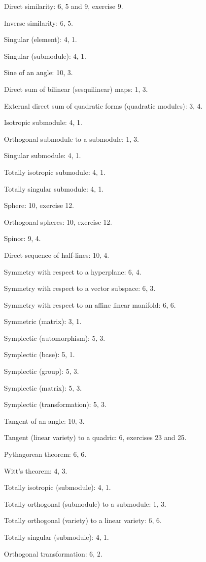 Direct similarity: 6, 5 and 9, exercise 9.

Inverse similarity: 6, 5.

Singular (element): 4, 1.

Singular (submodule): 4, 1.

Sine of an angle: 10, 3.

Direct sum of bilinear (sesquilinear) maps: 1, 3.

External direct sum of quadratic forms (quadratic modules): 3, 4.

Isotropic submodule: 4, 1.

Orthogonal submodule to a submodule: 1, 3.

Singular submodule: 4, 1.

Totally isotropic submodule: 4, 1.

Totally singular submodule: 4, 1.

Sphere: 10, exercise 12.

Orthogonal spheres: 10, exercise 12.

Spinor: 9, 4.

Direct sequence of half-lines: 10, 4.

Symmetry with respect to a hyperplane: 6, 4.

Symmetry with respect to a vector subspace: 6, 3.

Symmetry with respect to an affine linear manifold: 6, 6.

Symmetric (matrix): 3, 1.

Symplectic (automorphism): 5, 3.

Symplectic (base): 5, 1.

Symplectic (group): 5, 3.

Symplectic (matrix): 5, 3.

Symplectic (transformation): 5, 3.

Tangent of an angle: 10, 3.

Tangent (linear variety) to a quadric: 6, exercises 23 and 25.

Pythagorean theorem: 6, 6.

Witt's theorem: 4, 3.

Totally isotropic (submodule): 4, 1.

Totally orthogonal (submodule) to a submodule: 1, 3.

Totally orthogonal (variety) to a linear variety: 6, 6.

Totally singular (submodule): 4, 1.

Orthogonal transformation: 6, 2.


